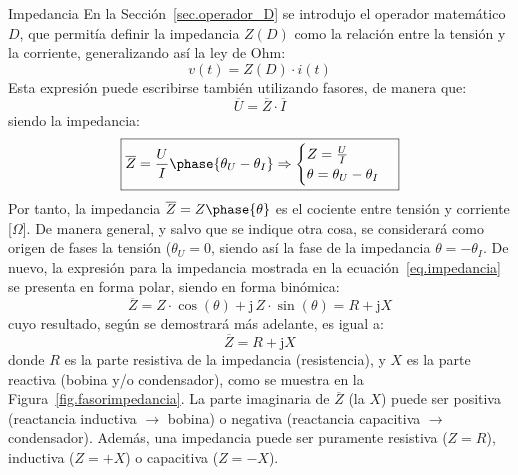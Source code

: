 \documentclass[11pt]{book} %
\makeatletter
\numberwithin{dummy}{section}
\theoremstyle{ocrenumbox}
\theoremstyle{blacknumex}
\theoremstyle{blacknumbox}
\theoremstyle{ocrenum}
\renewcommand{\subsection}{\@startsection {subsection}{2}{\z@}
{-3ex \@plus -0.1ex \@minus -.4ex}
{0.5ex \@plus.2ex }
{\normalfont\sffamily\bfseries}}
\makeatother
\begin{document}
	\subsection{Impedancia}
	En la Sección~\ref{sec.operador_D} se introdujo el operador matemático $D$, que permitía definir la impedancia $Z(D)$ como la relación entre la tensión y la corriente, generalizando así la ley de Ohm:
	\begin{equation*}
		v(t)=Z(D)\cdot i(t)
	\end{equation*}
	Esta expresión puede escribirse también utilizando fasores, de manera que: 
	\begin{equation}\label{eq.ohm_generalizada}
		\boxed{ \overline{U}=\overline{Z}\cdot\overline{I} }
	\end{equation}
	siendo la impedancia:
	\begin{equation}\label{eq.impedancia}
		\boxed{\overline{Z} = \frac{U}{I}\phase{\theta_U - \theta_I} \Rightarrow 
			\begin{cases}
				Z = \frac{U}{I}\\
				\theta = \theta_U - \theta_I
		\end{cases}}
	\end{equation}
	Por tanto, la impedancia $\overline{Z}=Z\phase{\theta}$ es el cociente entre tensión y corriente [$\Omega$]. De manera general, y salvo que se indique otra cosa, se considerará como origen de fases la tensión ($\theta_U=0$, siendo así la fase de la impedancia $\theta=-\theta_I$. De nuevo, la expresión para la impedancia mostrada en la ecuación~\eqref{eq.impedancia} se presenta en forma polar, siendo en forma binómica: 
	\begin{equation*}
		\overline{Z} = Z\cdot\cos(\theta)+\mathrm{j}\,Z\cdot\sin(\theta) = R + \mathrm{j} X
	\end{equation*}
	cuyo resultado, según se demostrará más adelante, es igual a: 
	\begin{equation}
		\boxed{\overline{Z} =  R + \mathrm{j} X}
	\end{equation}
	donde $R$ es la parte resistiva de la impedancia (resistencia), y $X$ es la parte reactiva (bobina y/o condensador), como se muestra en la Figura~\ref{fig.fasorimpedancia}. La parte imaginaria de $\overline{Z}$ (la $X$) puede ser positiva (reactancia inductiva $\rightarrow$ bobina) o negativa (reactancia capacitiva $\rightarrow$ condensador). Además, una impedancia puede ser puramente resistiva ($Z=R$), inductiva ($Z=+X$) o capacitiva ($Z=-X$).
\end{document}
